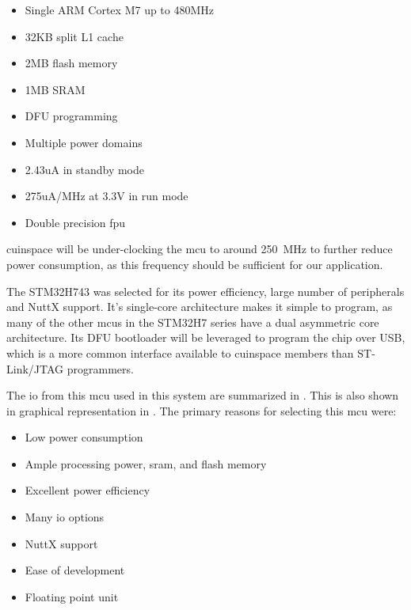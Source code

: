 \begin{itemize}
    \item Single ARM Cortex M7 up to 480MHz \cite[1]{stm32h743vi}
    \item 32KB split L1 cache \cite[1]{stm32h743vi}
    \item 2MB flash memory \cite[1]{stm32h743vi}
    \item 1MB SRAM \cite[1]{stm32h743vi}
    \item DFU programming \cite[Sec. 3.4]{stm32h743vi}
    \item Multiple power domains \cite[1]{stm32h743vi}
    \item 2.43uA in standby mode \cite[1]{stm32h743vi}
    \item 275uA/MHz at 3.3V in run mode \cite[1]{stm32h743vi}
    \item Double precision \gls{fpu} \cite[1]{stm32h743vi}
\end{itemize}

\Gls{cuinspace} will be under-clocking the \gls{mcu} to around \qty{250}{\mega\hertz} to further reduce power consumption, as this frequency should be sufficient for our application.

The STM32H743 was selected for its power efficiency, large number of peripherals and NuttX support. It's single-core
architecture makes it simple to program, as many of the other \glspl{mcu} in the STM32H7 series have a dual asymmetric
core architecture. Its DFU bootloader will be leveraged to program the chip over USB, which is a more common interface
available to \gls{cuinspace} members than ST-Link/JTAG programmers.

The \gls{io} from this \gls{mcu} used in this system are summarized in . This is also shown in
graphical representation in . The primary reasons for selecting this \gls{mcu} were:

\begin{itemize}
    \item Low power consumption
    \item Ample processing power, \gls{sram}, and flash memory
    \item Excellent power efficiency
    \item Many \gls{io} options
    \item NuttX support
    \item Ease of development
    \item Floating point unit
\end{itemize}

